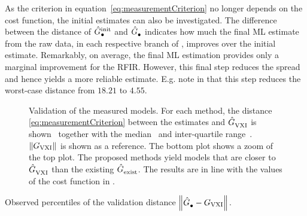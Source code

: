 As the criterion in equation~\eqref{eq:measurementCriterion} no longer depends on the cost function, the initial estimates can also be investigated.
The difference between the distance of $\model[init]{\bullet}$ and $\model{\bullet}$ indicates how much the final ML estimate from the raw data, in each respective branch of , improves over the initial estimate.
Remarkably, on average, the final ML estimation provides only a marginal improvement for the \gls{RFIR}. 
However, this final step reduces the spread and hence yields a more reliable estimate.
E.g. note in  that this step reduces the worst-case distance from $18.21$ to $4.55$.


\begin{figure}[p]
  \centering
  \setlength{\figurewidth}{0.85\columnwidth}
  \setlength{\figureheight}{0.68\figurewidth}
  \setlength{\figurewidth}{0.75\columnwidth}
  
  \caption[Validation cost of the different measurements.]{Validation of the measured models. 
  For each method, the distance \eqref{eq:measurementCriterion} between the estimates and $\model{VXI}$ is shown~ together with the median~ and inter-quartile range~.
  $\norm{G_{\mathrm{VXI}}}$ is shown as a reference.
  The bottom plot shows a zoom of the top plot.
  The proposed methods yield models that are closer to $\model{VXI}$ than the existing $\model{exist}$.
  The results are in line with the values of the cost function in .}
  \label{fig:validationMeasurements}
\end{figure}
\begin{table}[p]
  \centering
  \caption{Observed percentiles of the validation distance $\norm{\model{\bullet}-G_{\mathrm{VXI}}}$.}
% 

\label{tbl:validationMeasurements}
\end{table}

